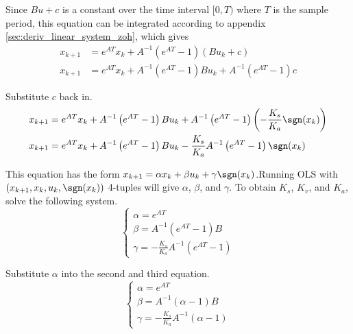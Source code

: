 Since $Bu + c$ is a constant over the time interval $[0, T)$ where $T$ is the
sample period, this equation can be integrated according to appendix
\ref{sec:deriv_linear_system_zoh}, which gives
\begin{align*}
  x_{k+1} &= e^{AT} x_k + A^{-1} (e^{AT} - 1) (Bu_k + c) \\
  x_{k+1} &= e^{AT} x_k + A^{-1} (e^{AT} - 1)Bu_k + A^{-1} (e^{AT} - 1)c
\end{align*}

Substitute $c$ back in.
\begin{align*}
  x_{k+1} &= e^{AT} x_k + A^{-1} \left(e^{AT} - 1\right) B u_k
    + A^{-1} \left(e^{AT} - 1\right) \left(-\frac{K_s}{K_a} \sgn(x_k)\right) \\
  x_{k+1} &= e^{AT} x_k +  A^{-1} \left(e^{AT} - 1\right) B u_k
    - \frac{K_s}{K_a} A^{-1} \left(e^{AT} - 1\right) \sgn(x_k)
\end{align*}

This equation has the form
$x_{k+1} = \alpha x_k + \beta u_k + \gamma \sgn(x_k)$.\newline Running OLS with
$(x_{k+1}, x_k, u_k, \sgn(x_k))$ 4-tuples will give $\alpha$, $\beta$, and
$\gamma$. To obtain $K_s$, $K_v$, and $K_a$, solve the following system.
\begin{equation*}
  \begin{cases}
    \alpha = e^{AT} \\
    \beta = A^{-1} \left(e^{AT} - 1\right)B \\
    \gamma = -\frac{K_s}{K_a} A^{-1} \left(e^{AT} - 1\right)
  \end{cases}
\end{equation*}

Substitute $\alpha$ into the second and third equation.
\begin{equation}
  \begin{cases}
    \alpha = e^{AT} \\
    \beta = A^{-1} (\alpha - 1) B \\
    \gamma = -\frac{K_s}{K_a} A^{-1} (\alpha - 1)
  \end{cases} \label{eq:ols_system}
\end{equation}

